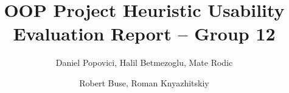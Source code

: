 \documentclass[sigconf]{acmart}
\title{OOP Project Heuristic Usability Evaluation Report -- Group 12}
\author{Daniel Popovici, Halil Betmezoglu, Mate Rodic}
\author{Robert Buse, Roman Knyazhitskiy}
\begin{document}
\begin{abstract}

\end{abstract}

\maketitle








\end{document}

